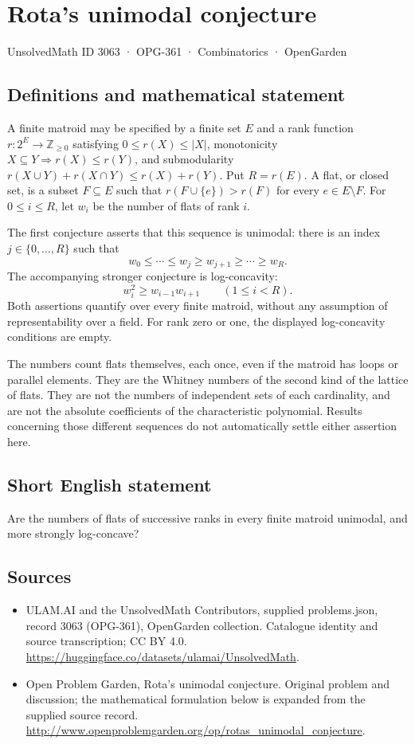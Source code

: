 \documentclass[11pt,a4paper]{article}
\begin{document}
\section*{Rota's unimodal conjecture}\label{3063}
{\small UnsolvedMath ID 3063 · OPG-361 · Combinatorics · OpenGarden}
\subsection{Definitions and mathematical statement}
A finite matroid may be specified by a finite set $E$ and a rank function
$r:2^E\to\mathbb Z_{\ge0}$ satisfying $0\le r(X)\le|X|$,
monotonicity $X\subseteq Y\Rightarrow r(X)\le r(Y)$, and submodularity
$r(X\cup Y)+r(X\cap Y)\le r(X)+r(Y)$. Put $R=r(E)$.
A flat, or closed set, is a subset $F\subseteq E$ such that
$r(F\cup\{e\})>r(F)$ for every $e\in E\setminus F$.
For $0\le i\le R$, let $w_i$ be the number of flats of rank $i$.

The first conjecture asserts that this sequence is unimodal: there is
an index $j\in\{0,\ldots,R\}$ such that
\[
 w_0\le\cdots\le w_j\ge w_{j+1}\ge\cdots\ge w_R.
\]
The accompanying stronger conjecture is log-concavity:
\[
 w_i^2\ge w_{i-1}w_{i+1}\qquad(1\le i<R).
\]
Both assertions quantify over every finite matroid, without any assumption
of representability over a field. For rank zero or one, the displayed
log-concavity conditions are empty.

The numbers count flats themselves, each once, even if the matroid has
loops or parallel elements. They are the Whitney numbers of the second
kind of the lattice of flats. They are not the numbers of independent
sets of each cardinality, and are not the absolute coefficients of the
characteristic polynomial. Results concerning those different sequences
do not automatically settle either assertion here.
\subsection{Short English statement}
Are the numbers of flats of successive ranks in every finite matroid unimodal, and more strongly log-concave?
\subsection{Sources}
\begin{itemize}
\item[S1] ULAM.AI and the UnsolvedMath Contributors, supplied problems.json, record 3063 (OPG-361), OpenGarden collection. Catalogue identity and source transcription; CC BY 4.0.
\url{https://huggingface.co/datasets/ulamai/UnsolvedMath}.
\item[S2] Open Problem Garden, Rota's unimodal conjecture. Original problem and discussion; the mathematical formulation below is expanded from the supplied source record.
\url{http://www.openproblemgarden.org/op/rotas_unimodal_conjecture}.
\end{itemize}
\end{document}
